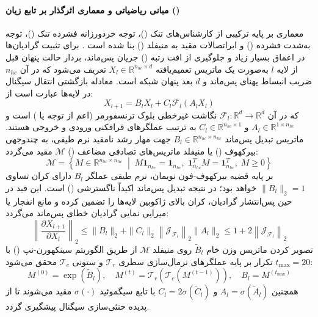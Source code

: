 \item {}

\paragraph*{مبانی ریاضیاتی و معماری اثرگذار بر تابع زیان ()}
معماری  بر پایه ترکیبی از کارشناس‌های تنک ()، توجه خردورزانه فشرده تنک ()، توجه به‌شدت فشرده () و ابراتصالات مقید به منیفلد () بنا شده است \cite{deepseek2026v4}. برای تثبیت گرادیان‌ها در اعماق بسیار زیاد و جلوگیری از افت رتبه () جریان پس‌ماند، بردار حالت پنهان قبل از لایه $l$ به‌صورت یک ماتریس تعمیم‌یافته $X_l \in \mathbb{R}^{n_{hc} \times d}$ تعریف می‌شود که در آن $n_{hc}$ ضریب انبساط پهنای پس‌ماند و $d$ بعد پنهان شبکه است. معادله بازگشتی انتقال سیگنال در لایه‌ها عبارت است از:
\begin{equation}
    X_{l+1} = B_l X_l + C_l \mathcal{F}_l(A_l X_l)
\end{equation}
که در آن $\mathcal{F}_l: \mathbb{R}^d \to \mathbb{R}^d$ نگاشت غیرخطی بلوک ترنسفورمر (اعم از توجه یا ) است و $A_l \in \mathbb{R}^{1 \times n_{hc}}$ و $C_l \in \mathbb{R}^{n_{hc} \times 1}$ به ترتیب عملگرهای فرافکنی ورودی و خروجی هستند. ماتریس تبدیل پس‌ماند $B_l \in \mathbb{R}^{n_{hc} \times n_{hc}}$ جهت مهار رشد نامقید نرم طیفی، به چندوجهی بیرکهوف () یا منیفلد ماتریس‌های تصادفی مضاعف () $\mathcal{M}$ مقید می‌گردد:
\begin{equation}
    \mathcal{M} = \left\{ M \in \mathbb{R}^{n_{hc} \times n_{hc}} \;\middle|\; M \mathbf{1}_{n_{hc}} = \mathbf{1}_{n_{hc}}, \; \mathbf{1}_{n_{hc}}^T M = \mathbf{1}_{n_{hc}}^T, \; M \ge 0 \right\}
\end{equation}
بر پایه قضیه بیرکهوف-فون نویمان، نرم طیفی عملگر $B_l$ دارای کران تساوی $\|B_l\|_2 = 1$ خواهد بود؛ در نتیجه تبدیل پس‌ماند اکیداً ناگسترشی () است. این قید در حین پس‌انتشار گرادیان، کران بالای ژاکوبین لایه‌ها را تضمین کرده و مانع انفجار یا میرایی نمایی گرادیان خطای پس‌ماند می‌گردد:
\begin{equation}
    \left\| \frac{\partial X_{l+1}}{\partial X_l} \right\|_2 \le \|B_l\|_2 + \|C_l\|_2 \left\| \mathcal{J}_{\mathcal{F}_l} \right\|_2 \|A_l\|_2 \le 1 + 2 \left\| \mathcal{J}_{\mathcal{F}_l} \right\|_2
\end{equation}
تصویر کردن ماتریس وزن خام $\tilde{B}_l$ روی منیفلد $\mathcal{M}$ از طریق الگوریتم سینکهورن-نپ () با $t_{\max} = 20$ تکرار بر پایه عملگرهای نرمال‌سازی سطری $\mathcal{T}_r$ و ستونی $\mathcal{T}_c$ محقق می‌شود:
\begin{equation}
    M^{(0)} = \exp(\tilde{B}_l), \quad M^{(t)} = \mathcal{T}_r\left(\mathcal{T}_c\left(M^{(t-1)}\right)\right), \quad B_l = M^{(t_{\max})}
\end{equation}
همچنین $A_l = \sigma(\tilde{A}_l)$ و $C_l = 2\sigma(\tilde{C}_l)$ با تابع سیگموئید $\sigma(\cdot)$ مقید می‌شوند تا از پدیده خنثی‌سازی سیگنال پیشگیری گردد.

